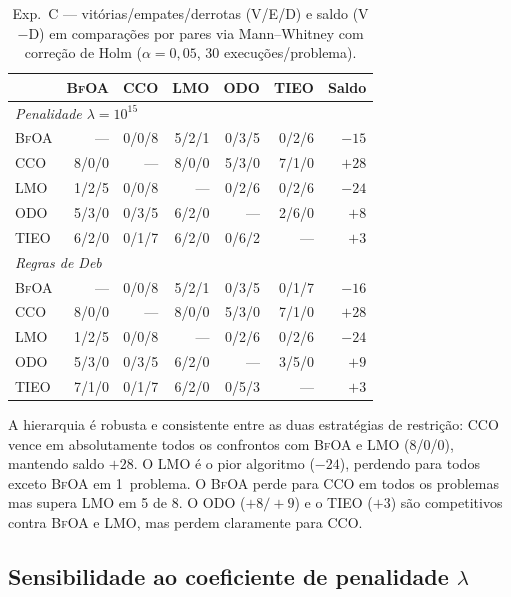 \documentclass[12pt, a4paper]{article}
\newcommand{\alg}[1]{\textsc{#1}}
\begin{document}
\begin{table}[h!]
\centering
\caption{Exp.~C — vitórias/empates/derrotas (V/E/D) e saldo (V$-$D) em
  comparações por pares via Mann--Whitney com correção de Holm
  ($\alpha=0{,}05$, 30 execuções/problema).}
\label{tab:wtl}
\small
\begin{tabular}{lrrrrrr}
\toprule
 & \alg{BfOA} & \alg{CCO} & \alg{LMO} & \alg{ODO} & \alg{TIEO} & Saldo \\
\midrule
\multicolumn{7}{l}{\textit{Penalidade $\lambda = 10^{15}$}} \\
\alg{BfOA} & — & 0/0/8 & 5/2/1 & 0/3/5 & 0/2/6 & $-15$ \\
\alg{CCO}  & 8/0/0 & — & 8/0/0 & 5/3/0 & 7/1/0 & $+28$ \\
\alg{LMO}  & 1/2/5 & 0/0/8 & — & 0/2/6 & 0/2/6 & $-24$ \\
\alg{ODO}  & 5/3/0 & 0/3/5 & 6/2/0 & — & 2/6/0 & $+8$ \\
\alg{TIEO} & 6/2/0 & 0/1/7 & 6/2/0 & 0/6/2 & — & $+3$ \\
\midrule
\multicolumn{7}{l}{\textit{Regras de Deb}} \\
\alg{BfOA} & — & 0/0/8 & 5/2/1 & 0/3/5 & 0/1/7 & $-16$ \\
\alg{CCO}  & 8/0/0 & — & 8/0/0 & 5/3/0 & 7/1/0 & $+28$ \\
\alg{LMO}  & 1/2/5 & 0/0/8 & — & 0/2/6 & 0/2/6 & $-24$ \\
\alg{ODO}  & 5/3/0 & 0/3/5 & 6/2/0 & — & 3/5/0 & $+9$ \\
\alg{TIEO} & 7/1/0 & 0/1/7 & 6/2/0 & 0/5/3 & — & $+3$ \\
\bottomrule
\end{tabular}
\end{table}

A hierarquia é robusta e consistente entre as duas estratégias de
restrição: \alg{CCO} vence em absolutamente todos os confrontos
com \alg{BfOA} e \alg{LMO} (8/0/0), mantendo saldo $+28$.
O \alg{LMO} é o pior algoritmo ($-24$), perdendo para todos exceto
\alg{BfOA} em 1~problema. O \alg{BfOA} perde para \alg{CCO} em todos
os problemas mas supera \alg{LMO} em 5 de 8. O \alg{ODO} ($+8/+9$)
e o \alg{TIEO} ($+3$) são competitivos contra \alg{BfOA} e \alg{LMO},
mas perdem claramente para \alg{CCO}.

\subsection{Sensibilidade ao coeficiente de penalidade $\lambda$}
\end{document}
